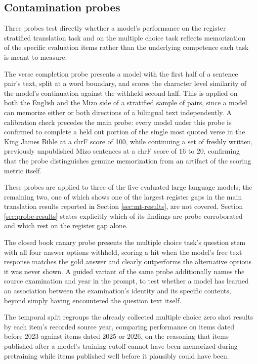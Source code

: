 \documentclass[pdflatex,sn-mathphys-ay]{sn-jnl}
\begin{document}
\subsection{Contamination probes}
\label{sec:probes}

Three probes test directly whether a model's performance on the register stratified translation task and on the multiple choice task reflects memorization of the specific evaluation items rather than the underlying competence each task is meant to measure.

The verse completion probe presents a model with the first half of a sentence pair's text, split at a word boundary, and scores the character level similarity of the model's continuation against the withheld second half. This is applied on both the English and the Mizo side of a stratified sample of pairs, since a model can memorize either or both directions of a bilingual text independently. A calibration check precedes the main probe: every model under this probe is confirmed to complete a held out portion of the single most quoted verse in the King James Bible at a chrF score of 100, while continuing a set of freshly written, previously unpublished Mizo sentences at a chrF score of 16 to 20, confirming that the probe distinguishes genuine memorization from an artifact of the scoring metric itself.

These probes are applied to three of the five evaluated large language models; the remaining two, one of which shows one of the largest register gaps in the main translation results reported in Section \ref{sec:mt-results}, are not covered. Section \ref{sec:probe-results} states explicitly which of its findings are probe corroborated and which rest on the register gap alone.

The closed book canary probe presents the multiple choice task's question stem with all four answer options withheld, scoring a hit when the model's free text response matches the gold answer and clearly outperforms the alternative options it was never shown. A guided variant of the same probe additionally names the source examination and year in the prompt, to test whether a model has learned an association between the examination's identity and its specific contents, beyond simply having encountered the question text itself.

The temporal split regroups the already collected multiple choice zero shot results by each item's recorded source year, comparing performance on items dated before 2023 against items dated 2025 or 2026, on the reasoning that items published after a model's training cutoff cannot have been memorized during pretraining while items published well before it plausibly could have been.
\end{document}
